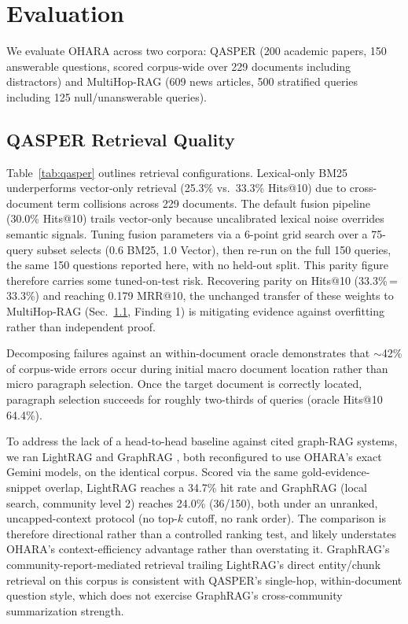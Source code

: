 \documentclass[conference,a4paper]{IEEEtran}
\begin{document}
\section{Evaluation}
\label{sec:eval}

We evaluate OHARA across two corpora: QASPER (200 academic papers, 150 answerable questions, scored corpus-wide over 229 documents including distractors) and MultiHop-RAG (609 news articles, 500 stratified queries including 125 null/unanswerable queries).

\subsection{QASPER Retrieval Quality}
\label{sec:eval71}

Table~\ref{tab:qasper} outlines retrieval configurations. Lexical-only BM25 underperforms vector-only retrieval (25.3\% vs.\ 33.3\% Hits@10) due to cross-document term collisions across 229 documents. The default fusion pipeline (30.0\% Hits@10) trails vector-only because uncalibrated lexical noise overrides semantic signals. Tuning fusion parameters via a 6-point grid search over a 75-query subset selects (0.6 BM25, 1.0 Vector), then re-run on the full 150 queries, the same 150 questions reported here, with no held-out split. This parity figure therefore carries some tuned-on-test risk. Recovering parity on Hits@10 (33.3\%\,=\,33.3\%) and reaching 0.179 MRR@10, the unchanged transfer of these weights to MultiHop-RAG (Sec.~\ref{sec:eval71}, Finding 1) is mitigating evidence against overfitting rather than independent proof.

Decomposing failures against an within-document oracle demonstrates that $\sim$42\% of corpus-wide errors occur during initial macro document location rather than micro paragraph selection. Once the target document is correctly located, paragraph selection succeeds for roughly two-thirds of queries (oracle Hits@10 64.4\%).

To address the lack of a head-to-head baseline against cited graph-RAG systems, we ran LightRAG \cite{guo2024lightrag} and GraphRAG \cite{edge2024graphrag}, both reconfigured to use OHARA's exact Gemini models, on the identical corpus. Scored via the same gold-evidence-snippet overlap, LightRAG reaches a 34.7\% hit rate and GraphRAG (local search, community level 2) reaches 24.0\% (36/150), both under an unranked, uncapped-context protocol (no top-$k$ cutoff, no rank order). The comparison is therefore directional rather than a controlled ranking test, and likely understates OHARA's context-efficiency advantage rather than overstating it. GraphRAG's community-report-mediated retrieval trailing LightRAG's direct entity/chunk retrieval on this corpus is consistent with QASPER's single-hop, within-document question style, which does not exercise GraphRAG's cross-community summarization strength.
\end{document}

